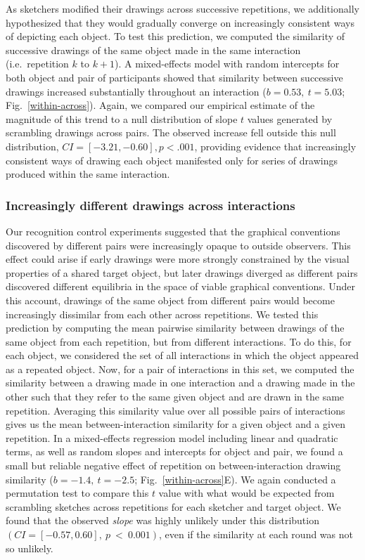 \documentclass[10pt,letterpaper]{article}
\begin{document}
As sketchers modified their drawings across successive repetitions, we additionally hypothesized that they would gradually converge on increasingly consistent ways of depicting each object.
To test this prediction, we computed the similarity of successive drawings of the same object made in the same interaction (i.e.~repetition $k$ to $k+1$). %
A mixed-effects model with random intercepts for both object and pair of participants showed that similarity between successive drawings increased substantially throughout an interaction ($b = 0.53,~t = 5.03$; Fig.~\ref{within-across}).
Again, we compared our empirical estimate of the magnitude of this trend to a null distribution of slope $t$ values generated by scrambling drawings across pairs.%
The observed increase fell outside this null distribution, $CI = [-3.21, -0.60], p < .001$, providing evidence that increasingly consistent ways of drawing each object manifested only for series of drawings produced within the same interaction.

\subsubsection{Increasingly different drawings across interactions}

Our recognition control experiments suggested that the graphical conventions discovered by different pairs were increasingly opaque to outside observers.
This effect could arise if early drawings were more strongly constrained by the visual properties of a shared target object, but later drawings diverged as different pairs discovered different equilibria in the space of viable graphical conventions.
Under this account, drawings of the same object from different pairs would become increasingly dissimilar from each other across repetitions.
We tested this prediction by computing the mean pairwise similarity between drawings of the same object from each repetition, but from different interactions.
To do this, for each object, we considered the set of all interactions in which the object appeared as a repeated object.
Now, for a pair of interactions in this set, we computed the similarity between a drawing made in one interaction and a drawing made in the other such that they refer to the same given object and are drawn in the same repetition.
Averaging this similarity value over all possible pairs of interactions gives us the mean between-interaction similarity for a given object and a given repetition.
In a mixed-effects regression model including linear and quadratic terms, as well as random slopes and intercepts for object and pair, we found a small but reliable negative effect of repetition on between-interaction drawing similarity ($b = -1.4, ~t = -2.5$; Fig.~\ref{within-across}E). %
We again conducted a permutation test to compare this $t$ value with what would be expected from scrambling sketches across repetitions for each sketcher and target object.
We found that the observed \emph{slope} was highly unlikely under this distribution $(CI = [-0.57, 0.60],~p~<~0.001)$, even if the similarity at each round was not so unlikely.
\end{document}
